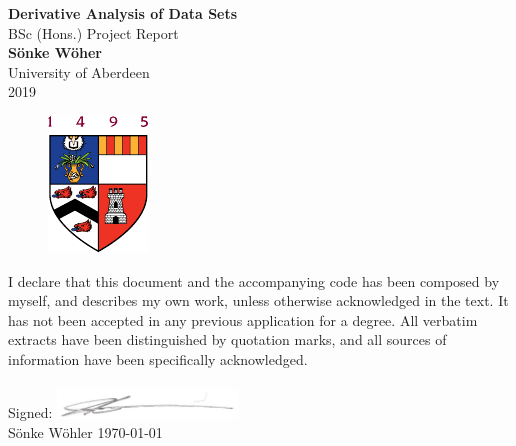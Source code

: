\documentclass[main.tex]{subfiles}
\begin{document}
  \begin{titlepage}
  \begin{center}
    \vspace*{2.0cm}
    
    \huge
    \textbf{Derivative Analysis of Data Sets} \\
    \LARGE
    BSc (Hons.) Project Report    \\
    \vspace{1.5cm}
    \Large
    \textbf{S\"onke W\"oher}\\
    \large
    University of Aberdeen     \\
    \vspace{1.5cm}
    2019
    
    
    \begin{figure}[h!]
      \centering
      \includegraphics{otherImages/abdnshield}
      \caption*{}
    \end{figure}
    
    \vfill
  \end{center}
  I declare that this document and the accompanying code has been composed by myself, and describes my own work, unless otherwise acknowledged in the text. It has not been accepted in any previous application for a degree. All verbatim extracts have been distinguished by quotation marks, and all sources of information have been specifically acknowledged.
  \\\\
  Signed: 
  \hfill \includegraphics[height=0.78cm]{otherImages/sonkiSignature}\hspace{2.5cm}
  \\
  S\"onke W\"ohler \hfil \today
\end{titlepage} 
\end{document}
